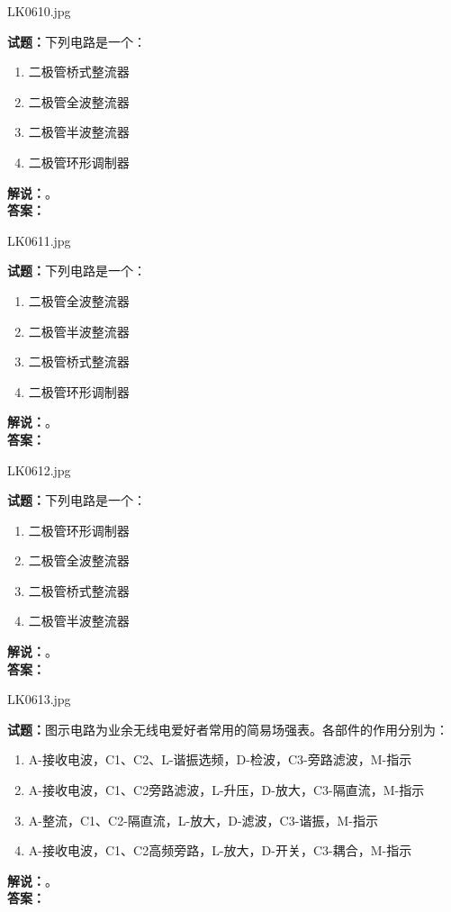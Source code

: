\documentclass{ctexbook}
\begin{document}
\vspace{\baselineskip}

LK0610.jpg

\noindent\textbf{试题：}下列电路是一个：
\begin{enumerate}[leftmargin=3em]
  \item 二极管桥式整流器
  \item 二极管全波整流器
  \item 二极管半波整流器
  \item 二极管环形调制器
\end{enumerate}
\noindent\textbf{解说：}\textbf{}。\\\noindent\textbf{答案：}

\vspace{\baselineskip}

LK0611.jpg

\noindent\textbf{试题：}下列电路是一个：
\begin{enumerate}[leftmargin=3em]
  \item 二极管全波整流器
  \item 二极管半波整流器
  \item 二极管桥式整流器
  \item 二极管环形调制器
\end{enumerate}
\noindent\textbf{解说：}\textbf{}。\\\noindent\textbf{答案：}

\vspace{\baselineskip}

LK0612.jpg

\noindent\textbf{试题：}下列电路是一个：
\begin{enumerate}[leftmargin=3em]
  \item 二极管环形调制器
  \item 二极管全波整流器
  \item 二极管桥式整流器
  \item 二极管半波整流器
\end{enumerate}
\noindent\textbf{解说：}\textbf{}。\\\noindent\textbf{答案：}

\vspace{\baselineskip}

LK0613.jpg

\noindent\textbf{试题：}图示电路为业余无线电爱好者常用的简易场强表。各部件的作用分别为：
\begin{enumerate}[leftmargin=3em]
  \item A-接收电波，C1、C2、L-谐振选频，D-检波，C3-旁路滤波，M-指示
  \item A-接收电波，C1、C2旁路滤波，L-升压，D-放大，C3-隔直流，M-指示
  \item A-整流，C1、C2-隔直流，L-放大，D-滤波，C3-谐振，M-指示
  \item A-接收电波，C1、C2高频旁路，L-放大，D-开关，C3-耦合，M-指示
\end{enumerate}
\noindent\textbf{解说：}\textbf{}。\\\noindent\textbf{答案：}
\end{document}
